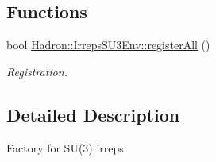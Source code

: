 \subsection*{Functions}
\begin{DoxyCompactItemize}
\item 
bool \mbox{\hyperlink{namespaceHadron_1_1IrrepsSU3Env_a7f85fa639d12623fddad0c09ba7ddef8}{Hadron\+::\+Irreps\+S\+U3\+Env\+::register\+All}} ()
\begin{DoxyCompactList}\small\item\em Registration. \end{DoxyCompactList}\end{DoxyCompactItemize}


\subsection{Detailed Description}
Factory for S\+U(3) irreps. 

